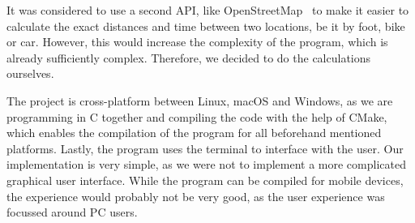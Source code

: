 It was considered to use a second API, like OpenStreetMap~\cite{openstreetmap} to make it easier to calculate the exact
distances and time between two locations, be it by foot, bike or car.
However, this would increase the complexity of the program, which is already sufficiently complex.
Therefore, we decided to do the calculations ourselves.

The project is cross-platform between Linux, macOS and Windows, as we are programming in C together and compiling the
code with the help of CMake, which enables the compilation of the program for all beforehand mentioned platforms.
Lastly, the program uses the terminal to interface with the user.
Our implementation is very simple, as we were not to implement a more complicated graphical user interface.
While the program can be compiled for mobile devices, the experience would probably not be very good, as the user
experience was focussed around PC users.
